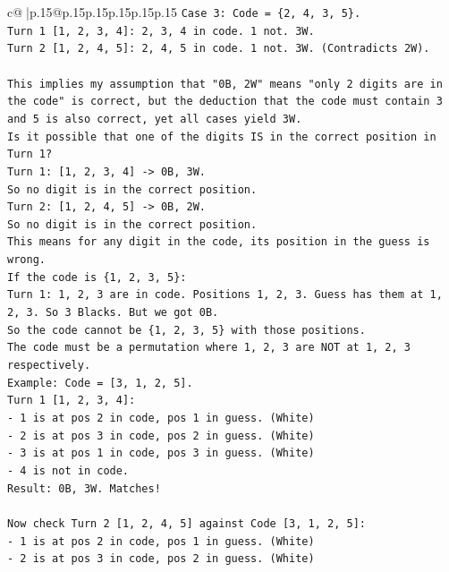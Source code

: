 \documentclass{article}
\begin{document}
{\begin{supertabular}{c@{$\;$}|p{.15\linewidth}@{}p{.15\linewidth}p{.15\linewidth}p{.15\linewidth}p{.15\linewidth}p{.15\linewidth}}
{{{\texttt{Case 3: Code = \{2, 4, 3, 5\}.} \\
\texttt{Turn 1 {[}1, 2, 3, 4{]}: 2, 3, 4 in code. 1 not. 3W.} \\
\texttt{Turn 2 {[}1, 2, 4, 5{]}: 2, 4, 5 in code. 1 not. 3W. (Contradicts 2W).} \\
\\ 
\texttt{This implies my assumption that "0B, 2W" means "only 2 digits are in the code" is correct, but the deduction that the code must contain 3 and 5 is also correct, yet all cases yield 3W.} \\
\texttt{Is it possible that one of the digits IS in the correct position in Turn 1?} \\
\texttt{Turn 1: {[}1, 2, 3, 4{]} {-}> 0B, 3W.} \\
\texttt{So no digit is in the correct position.} \\
\texttt{Turn 2: {[}1, 2, 4, 5{]} {-}> 0B, 2W.} \\
\texttt{So no digit is in the correct position.} \\
\texttt{This means for any digit in the code, its position in the guess is wrong.} \\
\texttt{If the code is \{1, 2, 3, 5\}:} \\
\texttt{Turn 1: 1, 2, 3 are in code. Positions 1, 2, 3. Guess has them at 1, 2, 3. So 3 Blacks. But we got 0B.} \\
\texttt{So the code cannot be \{1, 2, 3, 5\} with those positions.} \\
\texttt{The code must be a permutation where 1, 2, 3 are NOT at 1, 2, 3 respectively.} \\
\texttt{Example: Code = {[}3, 1, 2, 5{]}.} \\
\texttt{Turn 1 {[}1, 2, 3, 4{]}:} \\
\texttt{{-} 1 is at pos 2 in code, pos 1 in guess. (White)} \\
\texttt{{-} 2 is at pos 3 in code, pos 2 in guess. (White)} \\
\texttt{{-} 3 is at pos 1 in code, pos 3 in guess. (White)} \\
\texttt{{-} 4 is not in code.} \\
\texttt{Result: 0B, 3W. Matches!} \\
\\ 
\texttt{Now check Turn 2 {[}1, 2, 4, 5{]} against Code {[}3, 1, 2, 5{]}:} \\
\texttt{{-} 1 is at pos 2 in code, pos 1 in guess. (White)} \\
\texttt{{-} 2 is at pos 3 in code, pos 2 in guess. (White)} \\
}}}
\end{supertabular}}
\end{document}

